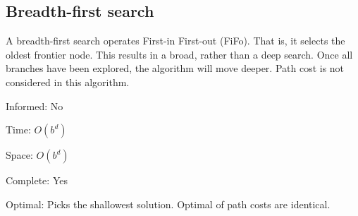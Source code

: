 
\subsection{Breadth-first search}

A breadth-first search operates First-in First-out (FiFo). That is, it selects the oldest frontier node. This results in a broad, rather than a deep search. Once all branches have been explored, the algorithm will move deeper. Path cost is not considered in this algorithm.

Informed: No

Time: \(O(b^d)\)

Space: \(O(b^d)\)

Complete: Yes

Optimal: Picks the shallowest solution. Optimal of path costs are identical.

